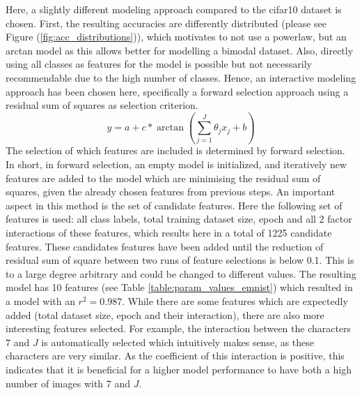 \documentclass{article} %
\begin{document}
Here, a slightly different modeling approach compared to the cifar10 dataset is chosen. 
First, the resulting accuracies are differently distributed (please see Figure (\ref{fig:acc_distributions})), which motivates to not use a powerlaw, but an arctan model as this allows better for modelling a bimodal dataset.
Also, directly using all classes as features for the model is possible but not necessarily recommendable due to the high number of classes.
Hence, an interactive modeling approach has been chosen here, specifically a forward selection approach using a residual sum of squares as selection criterion. 
$$y = a + c* \arctan{\left(\sum_{j = 1}^{J}{\theta_j x_j} + b \right)}$$
The selection of which features are included is determined by forward selection. In short, in forward selection, an empty model is initialized, and iteratively new features are added to the model which are minimising the residual sum of squares, given the already chosen features from previous steps.
An important aspect in this method is the set of candidate features. Here the following set of features is used: all class labels, total training dataset size, epoch and all 2 factor interactions of these features, which results here in a total of 1225 candidate features.
These candidates features have been added until the reduction of residual sum of square between two runs of feature selections is below 0.1.
This is to a large degree arbitrary and could be changed to different values.  
The resulting model has 10 features (see Table \ref{table:param_values_emnist}) which resulted in a model with an $r^2 = 0.987$. While there are some features which are expectedly added (total dataset size, epoch and their interaction), there are also more interesting features selected.
For example, the interaction between the characters $7$ and $J$ is automatically selected which intuitively makes sense, as these characters are very similar. As the coefficient of this interaction is positive, this indicates that it is beneficial for a higher model performance to have both a high number of images with $7$ and $J$.
\end{document}
